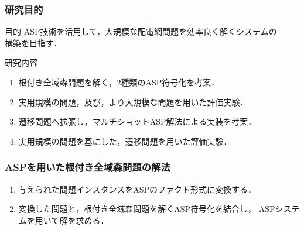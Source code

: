 \documentclass[dvipdfmx,11pt]{beamer}
\begin{document}
\begin{frame}\frametitle{研究目的}
 \begin{alertblock}{目的}
  ASP技術を活用して，大規模な配電網問題を効率良く解くシステムの\\ 構築を目指す．
 \end{alertblock}

 \begin{block}{研究内容}
  \begin{enumerate}
   \item 根付き全域森問題を解く，2種類のASP符号化を考案．
   \item 実用規模の問題，及び，より大規模な問題を用いた評価実験．
   \item 遷移問題へ拡張し，マルチショットASP解法による実装を考案．
   \item 実用規模の問題を基にした，遷移問題を用いた評価実験．
  \end{enumerate}
  
 \end{block}
 
\end{frame}

\begin{frame}\frametitle{ASPを用いた根付き全域森問題の解法}
 
 \begin{figure}[htbp]
  \centering
  \scalebox{0.8}{}
 \end{figure}

 \begin{exampleblock}{}
  \begin{enumerate}
   \item 与えられた問題インスタンスをASPのファクト形式に変換する．
   \item 変換した問題と，根付き全域森問題を解くASP符号化を結合し，
		 ASPシステムを用いて解を求める．
  \end{enumerate}
 \end{exampleblock}
\end{frame}
\end{document}
